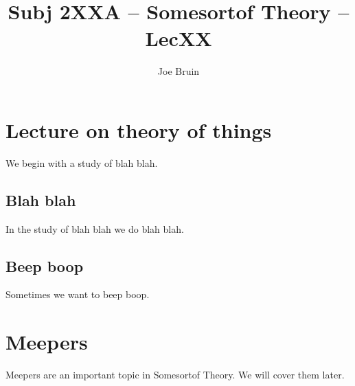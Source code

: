 \documentclass[12pt]{article} %
\title{Subj 2XXA -- Somesortof Theory -- LecXX}
\author{Joe Bruin}
\date{\formatdate{01}{09}{2015}} %
\begin{document}
\maketitle


\section{Lecture on theory of things}

We begin with a study of blah blah. 


\subsection{Blah blah}

In the study of blah blah we do blah blah. 


\subsection{Beep boop}

Sometimes we want to beep boop. 


\section{Meepers}

Meepers are an important topic in Somesortof Theory. We will cover them later. 
\end{document}
